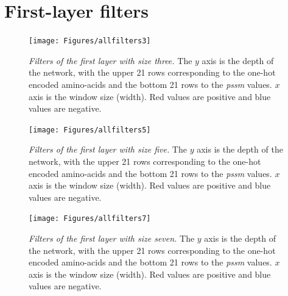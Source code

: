
\chapter{First-layer filters} \label{Chapter:Feat}
\begin{figure}
\centering
\texttt{[image: Figures/allfilters3]}\\
\caption{\textit{Filters of the first layer with size three.} The $y$ axis is the depth of the network, with the upper 21 rows corresponding to the one-hot encoded amino-acids and the bottom 21 rows to the \textit{pssm} values. $x$ axis is the window size (width). Red values are positive and blue values are negative.}
\label{fig:allfilters3}
\end{figure}

\begin{figure}
	\centering
	\texttt{[image: Figures/allfilters5]}
	\caption{\textit{Filters of the first layer with size five.} The $y$ axis is the depth of the network, with the upper 21 rows corresponding to the one-hot encoded amino-acids and the bottom 21 rows to the \textit{pssm} values. $x$ axis is the window size (width). Red values are positive and blue values are negative.}
	\label{fig:allfilters5}
\end{figure}

\begin{figure}
	\centering
	\texttt{[image: Figures/allfilters7]}
	\caption{\textit{Filters of the first layer with size seven.} The $y$ axis is the depth of the network, with the upper 21 rows corresponding to the one-hot encoded amino-acids and the bottom 21 rows to the \textit{pssm} values. $x$ axis is the window size (width). Red values are positive and blue values are negative.}
	\label{fig:allfilters7}
\end{figure}


